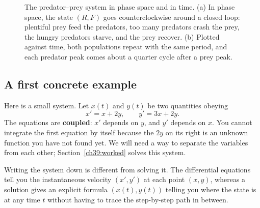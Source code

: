 \begin{figure}[H]
\caption{The predator--prey system in phase space and in time.
(a) In phase space, the state $(R, F)$ goes counterclockwise around a closed loop: plentiful prey
feed the predators, too many predators crash the prey, the hungry predators starve, and the prey recover.
(b) Plotted against time, both populations repeat with the same period, and each predator peak
comes about a quarter cycle after a prey peak.}
\label{ch39:fig-predator-prey}
\end{figure}

\subsection{A first concrete example}

Here is a small system. Let $x(t)$ and $y(t)$ be two quantities
obeying
\[
  x' = x + 2y, \qquad y' = 3x + 2y.
\]
The equations are \textbf{coupled}: $x'$ depends on $y$, and $y'$ depends on $x$. You cannot
integrate the first equation by itself because the $2y$ on its right is an
unknown function you have not found yet. We will need a way to separate the
variables from each other; Section~\ref{ch39:worked} solves this system.

\begin{happeningbox}
Writing the system down is different from solving it. The
differential equations tell you the instantaneous velocity $(x', y')$ at each
point $(x, y)$, whereas a solution gives an explicit formula $(x(t), y(t))$
telling you where the state is at any time $t$ without having to trace the
step-by-step path in between.
\end{happeningbox}

